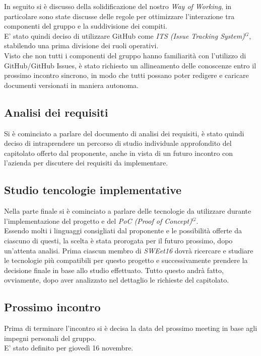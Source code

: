 \documentclass[a4paper, 11pt]{article}
\begin{document}
In seguito si è discusso della solidificazione del nostro \textit{Way of Working}, in particolare sono state discusse delle regole per ottimizzare l'interazione tra componenti del gruppo e la suddivisione dei compiti. \\
E' stato quindi deciso di utilizzare GitHub come \emph{ITS (Issue Tracking System)}$^{G}$, stabilendo una prima divisione dei ruoli operativi. \\
Visto che non tutti i componenti del gruppo hanno familiarità con l'utilizzo di GitHub/GitHub Issues, è stato richiesto un allineamento delle conoscenze entro il prossimo incontro sincrono, in modo che tutti possano poter redigere e caricare documenti versionati in maniera autonoma. 

\subsection{Analisi dei requisiti}
Si è cominciato a parlare del documento di analisi dei requisiti, è stato quindi deciso di intraprendere un percorso di studio individuale approfondito del capitolato offerto dal proponente, anche in vista di un futuro incontro con l'azienda per discutere dei requisiti da implementare.

\subsection{Studio tencologie implementative}

Nella parte finale si è cominciato a parlare delle tecnologie da utilizzare durante l'implementazione del progetto e del \emph{PoC (Proof of Concept)}$^{G}$. \\
Essendo molti i linguaggi consigliati dal proponente e le possibilità offerte da ciascuno di questi, la scelta è stata prorogata per il futuro prossimo, dopo un'attenta analisi.
Prima ciascun membro di \textit{SWEet16} dovrà ricercare e studiare le tecnologie più compatibili per questo progetto e successivamente prendere la decisione finale in base allo studio effettuato. Tutto questo andrà fatto, ovviamente, dopo aver analizzato nel dettaglio le richieste del capitolato.

\subsection{Prossimo incontro}
Prima di terminare l'incontro si è decisa la data del prossimo meeting in base agli impegni personali del gruppo. \\
E' stato definito per giovedì 16 novembre.
\end{document}
